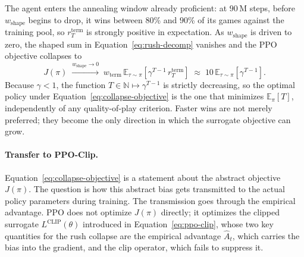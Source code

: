 The agent enters the annealing window already proficient: at $90\,\text{M}$ steps, before $w_{\text{shape}}$ begins to drop, it wins between $80$\% and $90$\% of its games against the training pool, so $r^{\text{term}}_{T}$ is strongly positive in expectation. As $w_{\text{shape}}$ is driven to zero, the shaped sum in Equation~\ref{eq:rush-decomp} vanishes and the PPO objective collapses to
\begin{equation}
J(\pi) \;\xrightarrow{w_{\text{shape}} \to 0}\; w_{\text{term}}\, \mathbb{E}_{\tau \sim \pi}\!\left[\gamma^{T-1}\, r^{\text{term}}_{T}\right] \;\approx\; 10\, \mathbb{E}_{\tau \sim \pi}\!\left[\gamma^{T-1}\right].
\label{eq:collapse-objective}
\end{equation}
Because $\gamma < 1$, the function $T \in \mathbb{N} \mapsto \gamma^{T-1}$ is strictly decreasing, so the optimal policy under Equation~\ref{eq:collapse-objective} is the one that minimizes $\mathbb{E}_{\pi}[T]$, independently of any quality-of-play criterion. Faster wins are not merely preferred; they become the only direction in which the surrogate objective can grow.

\paragraph*{Transfer to PPO-Clip.}

Equation~\ref{eq:collapse-objective} is a statement about the abstract objective $J(\pi)$. The question is how this abstract bias gets transmitted to the actual policy parameters during training. The transmission goes through the empirical advantage. PPO does not optimize $J(\pi)$ directly; it optimizes the clipped surrogate $L^{\text{CLIP}}(\theta)$ introduced in Equation~\ref{eq:ppo-clip}, whose two key quantities for the rush collapse are the empirical advantage $\hat{A}_t$, which carries the bias into the gradient, and the clip operator, which fails to suppress it.

\vspace*{0.1cm}

